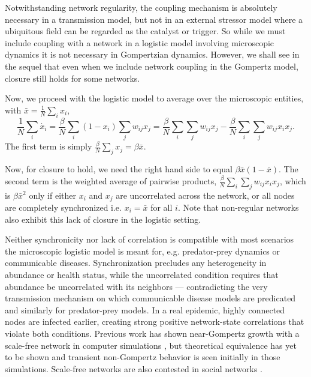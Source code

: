 \documentclass{article}
\begin{document}
Notwithstanding network regularity, the coupling mechanism is absolutely necessary in a transmission model, but not in an external stressor model where a ubiquitous field can be regarded as the catalyst or trigger. So while we must include coupling with a network in a logistic model involving microscopic dynamics it is not necessary in Gompertzian dynamics. However, we shall see in the sequel that even when we include network coupling in the Gompertz model, closure still holds for some networks. 

Now, we proceed with the logistic model to average over the microscopic entities, with $\bar{x}=\frac{1}{N}\sum_ix_i$,
\begin{equation}
  \label{eq:microDeterministic}
  \frac{1}{N}\sum_i\dot{x_i} = \frac{\beta}{N}\sum_i (1-x_i)\sum_j w_{ij} x_j = \frac{\beta}{N}\sum_i\sum_j w_{ij} x_j - \frac{\beta}{N}\sum_i\sum_j w_{ij} x_i x_j.
\end{equation}
The first term is simply $\frac{\beta}{N}\sum_j x_j = \beta\bar{x}$.

Now, for closure to hold, we need the right hand side to equal $\beta \bar{x}(1 - \bar{x})$. The second term is the weighted average of pairwise products, $\frac{\beta}{N}\sum_i\sum_j w_{ij} x_i x_j$, which is $\beta \bar{x}^2$ only if either $x_i$ and $x_j$ are uncorrelated across the network, or all nodes are completely synchronized i.e. $x_i=\bar{x}$ for all $i$. Note that non-regular networks also exhibit this lack of closure in the logistic setting.

Neither synchronicity nor lack of correlation is compatible with most scenarios the microscopic logistic model is meant for, e.g. predator-prey dynamics or communicable diseases. Synchronization precludes any heterogeneity in abundance or health status, while the uncorrelated condition requires that abundance be uncorrelated with its neighbors — contradicting the very transmission mechanism on which communicable disease models are predicated and similarly for predator-prey models. In a real epidemic, highly connected nodes are infected earlier, creating strong positive network-state correlations that violate both conditions. Previous work has shown near-Gompertz growth with a scale-free network in computer simulations \cite{zonta2022virus}, but theoretical equivalence has yet to be shown and transient non-Gompertz behavior is seen initially in those simulations. Scale-free networks are also contested in social networks \cite{clauset2009power,broido2019scale,holme2019rare}.
\end{document}
